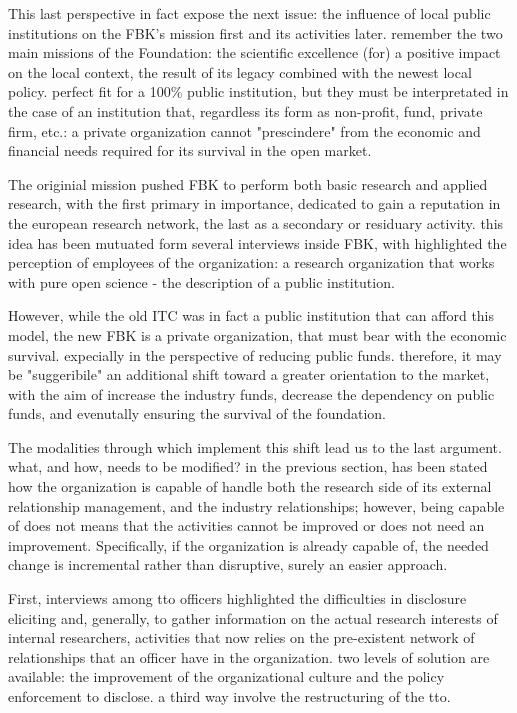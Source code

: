 This last perspective in fact expose the next issue: the influence of local public institutions on the FBK's mission first and its activities later. remember the two main missions of the Foundation: the scientific excellence (for) a positive impact on the local context, the result of its legacy combined with the newest local policy. perfect fit for a 100\% public institution, but they must be interpretated in the case of an institution that, regardless its form as non-profit, fund, private firm, etc.: a private organization cannot "prescindere" from the economic and financial needs required for its survival in the open market. 

The originial mission pushed FBK to perform both basic research and applied research, with the first primary in importance, dedicated to gain a reputation in the european research network, the last as a secondary or residuary activity. this idea has been mutuated form several interviews inside FBK, with highlighted the perception of employees of the organization: a research organization that works with pure open science - the description of a public institution. 

However, while the old ITC was in fact a public institution that can afford this model, the new FBK is a private organization, that must bear with the economic survival. expecially in the perspective of reducing public funds. therefore, it may be "suggeribile" an additional shift toward a greater orientation to the market, with the aim of increase the industry funds, decrease the dependency on public funds, and evenutally ensuring the survival of the foundation.

The modalities through which implement this shift lead us to the last argument. what, and how, needs to be modified? in the previous section, has been stated how the organization is capable of handle both the research side of its external relationship management, and the industry relationships; however, being capable of does not means that the activities cannot be improved or does not need an improvement. Specifically, if the organization is already capable of, the needed change is incremental rather than disruptive, surely an easier approach.

First, interviews among tto officers highlighted the difficulties in disclosure eliciting and, generally, to gather information on the actual research interests of internal researchers, activities that now relies on the pre-existent network of relationships that an officer have in the organization. two levels of solution are available: the improvement of the organizational culture and the policy enforcement to disclose. a third way involve the restructuring of the tto.

